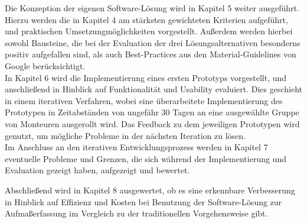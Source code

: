 Die Konzeption der eigenen Software-Lösung wird in Kapitel 5 weiter ausgeführt.
Hierzu werden die in Kapitel 4 am stärksten gewichteten Kriterien aufgeführt, und praktischen Umsetzungmöglichkeiten vorgestellt.
Außerdem werden hierbei sowohl Bausteine, die bei der Evaluation der drei Lösungsalternativen besonderns positiv aufgefallen sind, als auch Best-Practices aus den Material-Guidelines von Google \citep{AndroidMG} berücksichtigt.  \\

In Kapitel 6 wird die Implementierung eines ersten Prototyps vorgestellt, und anschließend in Hinblick auf Funktionalität und Usability evaluiert. Dies geschieht in einem iterativen Verfahren, wobei eine überarbeitete Implementierung des Prototypen in Zeitabständen von ungefähr 30 Tagen an eine ausgewählte Gruppe von Monteuren ausgerollt wird. 
Das Feedback zu dem jeweiligen Prototypen wird genutzt, um mögliche Probleme in der nächsten Iteration zu lösen. \\

Im Anschluss an den iterativen Entwicklungsprozess werden in Kapitel 7 eventuelle Probleme und Grenzen, die sich während der Implementierung und Evaluation gezeigt haben, aufgezeigt und bewertet.

Abschließend wird in Kapitel 8 ausgewertet, ob es eine erkennbare Verbesserung in Hinblick auf Effizienz und Kosten bei Benutzung der Software-Lösung zur Aufmaßerfassung im Vergleich zu der traditionellen Vorgehensweise gibt. \\
